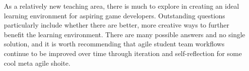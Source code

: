 \documentclass{scrartcl}
\begin{document}
As a relatively new teaching area, there is much to explore in creating an ideal learning environment for aspiring game developers. Outstanding questions particularly include whether there are better, more creative ways to further benefit the learning environment. There are many possible answers and no single solution, and it is worth recommending that agile student team workflows continue to be improved over time through iteration and self-reflection for some cool meta agile shoite.

 

\end{document}
